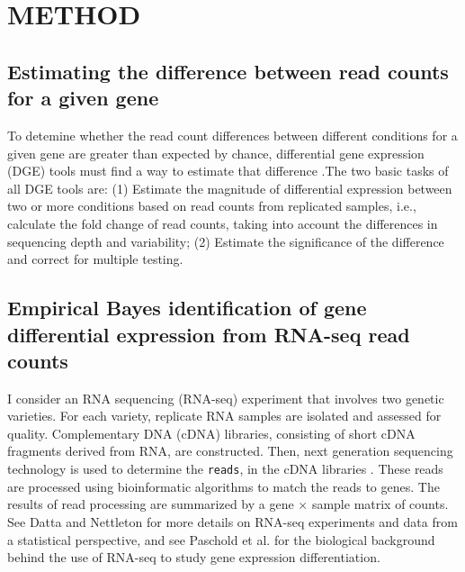 \documentclass[11pt]{isuthesis}
\begin{document}


\tableofcontents
{} \cleardoublepage {}
{}
\listoftables
\cleardoublepage {} {}
\listoffigures



\cleardoublepage {}  
\cleardoublepage {}         



\newpage
{}




\chapter{METHOD}

\section{Estimating the difference between read counts for a given gene}

To detemine whether the read count differences between different conditions for a given gene are greater than expected by chance, differential gene expression (DGE) tools must find a way to estimate that difference \citep{dundar2015introduction}.The two basic tasks of all DGE tools are: (1) Estimate the magnitude of differential expression between two or more conditions based on read counts from replicated samples, i.e., calculate the fold change of read counts, taking into account the differences in sequencing depth and variability; (2) Estimate the significance of the difference and correct for multiple testing. 

\section{Empirical Bayes identification of gene differential expression from RNA-seq read counts}

I consider an RNA sequencing (RNA-seq) experiment that involves two genetic varieties. For each variety, replicate RNA samples are isolated and assessed for quality. Complementary DNA (cDNA) libraries, consisting of short cDNA fragments derived from RNA, are constructed. Then, next generation sequencing technology is used to determine the {\tt reads}, in the cDNA libraries \citep{niemi2015empirical}. These reads are processed using bioinformatic algorithms to match the reads to genes. The results of read processing are summarized by a gene $\times$ sample matrix of counts. See Datta and Nettleton \citep{datta2014statistical} for more details on RNA-seq experiments and data from a statistical perspective, and see Paschold et al. \citep{paschold2012complementation} for the biological background behind the use of RNA-seq to study gene expression differentiation. 
\end{document}
